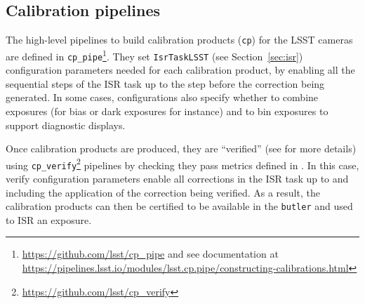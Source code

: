 \subsection{Calibration pipelines}
\label{sec:calib_pipe}

The high-level pipelines to build calibration products (\texttt{cp}) for the LSST cameras are defined in \texttt{cp\_pipe}\footnote{\url{https://github.com/lsst/cp\_pipe} and see documentation at \url{https://pipelines.lsst.io/modules/lsst.cp.pipe/constructing-calibrations.html}}.
They set \texttt{IsrTaskLSST} (see Section~\ref{sec:isr}) configuration parameters needed for each calibration product, by enabling all the sequential steps of the ISR task up to the step before the correction being generated. In some cases, configurations also specify whether to combine exposures (for bias or dark exposures for instance) and to bin exposures to support diagnostic displays.

Once calibration products are produced, they are ``verified'' (see \citet{DMTN-222} for more details) using \texttt{cp\_verify}\footnote{\url{https://github.com/lsst/cp\_verify}} pipelines by checking they pass metrics defined in \citet{DMTN-101}.
In this case, verify configuration parameters enable all corrections in the ISR task up to and including the application of the correction being verified. As a result, the calibration products can then be certified to be available in the \texttt{butler} and used to ISR an exposure.
